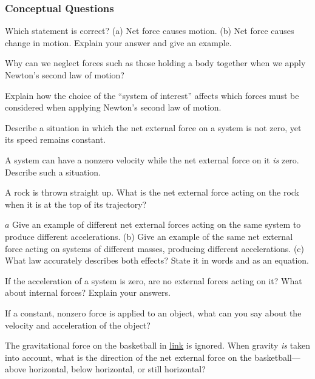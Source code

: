 \documentclass[
]{book}
\newenvironment{conceptual-questions}{}{}
\begin{document}
\hypertarget{fs-id3158911}{}
\begin{conceptual-questions}

\hypertarget{conceptual-questions-13}{%
\subsubsection{Conceptual Questions}\label{conceptual-questions-13}}

\hypertarget{fs-id2928601}{}
\leavevmode\hypertarget{fs-id1429418}{}%
Which statement is correct? (a) Net force causes motion. (b) Net force
causes change in motion. Explain your answer and give an example.

\hypertarget{fs-id2423185}{}
\leavevmode\hypertarget{fs-id2990963}{}%
Why can we neglect forces such as those holding a body together when we
apply Newton's second law of motion?

\hypertarget{fs-id3010660}{}
\leavevmode\hypertarget{fs-id3243612}{}%
Explain how the choice of the ``system of interest'' affects which forces
must be considered when applying Newton's second law of motion.

\hypertarget{fs-id2672485}{}
\leavevmode\hypertarget{fs-id3037822}{}%
Describe a situation in which the net external force on a system is not
zero, yet its speed remains constant.

\hypertarget{fs-id3026744}{}
\leavevmode\hypertarget{fs-id2032223}{}%
A system can have a nonzero velocity while the net external force on it
\emph{is} zero. Describe such a situation.

\hypertarget{fs-id1449832}{}
\leavevmode\hypertarget{fs-id3080834}{}%
A rock is thrown straight up. What is the net external force acting on
the rock when it is at the top of its trajectory?

\hypertarget{fs-id1475076}{}
\leavevmode\hypertarget{fs-id2660220}{}%
\(a\) Give an example of different net external forces acting on the
same system to produce different accelerations. (b) Give an example of
the same net external force acting on systems of different masses,
producing different accelerations. (c) What law accurately describes
both effects? State it in words and as an equation.

\hypertarget{fs-id1930138}{}
\leavevmode\hypertarget{fs-id2937300}{}%
If the acceleration of a system is zero, are no external forces acting
on it? What about internal forces? Explain your answers.

\hypertarget{fs-id3180550}{}
\leavevmode\hypertarget{fs-id1471731}{}%
If a constant, nonzero force is applied to an object, what can you say
about the velocity and acceleration of the object?

\hypertarget{fs-id3210019}{}
\leavevmode\hypertarget{fs-id3046066}{}%
The gravitational force on the basketball in
\protect\hyperlink{import-auto-id1375143}{link} is ignored. When
gravity \emph{is} taken into account, what is the direction of the net
external force on the basketball---above horizontal, below horizontal,
or still horizontal?

\end{conceptual-questions}
\end{document}

